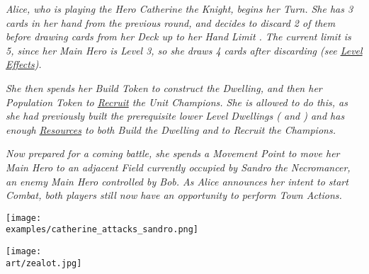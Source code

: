 \begin{multicols}{2}
\textit{Alice, who is playing the Hero Catherine the Knight, begins her Turn.
She has 3 cards in her hand from the previous round, and decides to discard 2 of them before drawing cards from her Deck up to her Hand Limit .
The current limit is 5, since her Main Hero is Level 3, so she draws 4 cards after discarding (see \hyperlink{Level}{Level Effects}).}\par
\textit{She then spends her Build Token to construct the  Dwelling, and then her Population Token to \hyperlink{Units}{Recruit} the  Unit Champions.
She is allowed to do this, as she had previously built the prerequisite lower Level Dwellings ( and ) and has enough \hyperlink{Resources}{Resources} to both Build the Dwelling and to Recruit the Champions.}\par
\textit{Now prepared for a coming battle, she spends a Movement Point to move her Main Hero to an adjacent Field currently occupied by Sandro the Necromancer, an enemy Main Hero controlled by Bob.
As Alice announces her intent to start Combat, both players still now have an opportunity to perform Town Actions.}\par

\texttt{[image: \\examples/catherine\_attacks\_sandro.png]}

\end{multicols}

\vfill

\begin{scaledfigure}[blanker]
 \centering
 \texttt{[image: \\art/zealot.jpg]}
\end{scaledfigure}
